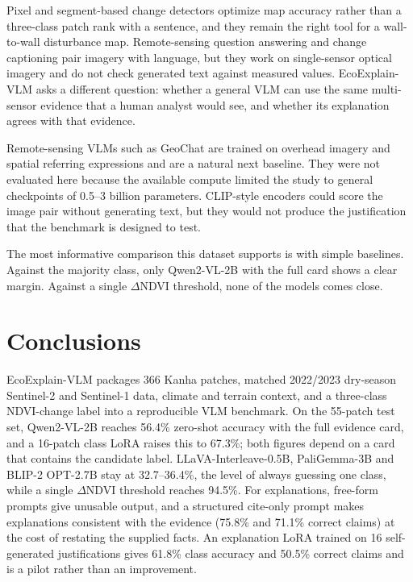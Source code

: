 Pixel and segment-based change detectors optimize map accuracy
rather than a three-class patch rank with a sentence, and they remain
the right tool for a wall-to-wall disturbance map. Remote-sensing
question answering  and change captioning
 pair imagery with language, but they work on
single-sensor optical imagery and do not check generated text against
measured values. EcoExplain-VLM asks a different question: whether a
general VLM can use the same multi-sensor evidence that a human analyst
would see, and whether its explanation agrees with that evidence.

Remote-sensing VLMs such as GeoChat are trained on
overhead imagery and spatial referring expressions and are a natural
next baseline. They were not evaluated here because the available
compute limited the study to general checkpoints of 0.5--3 billion
parameters. CLIP-style encoders could score the
image pair without generating text, but they would not produce the
justification that the benchmark is designed to test.

The most informative comparison this dataset supports is with simple
baselines. Against the majority class, only Qwen2-VL-2B with the full
card shows a clear margin. Against a single $\Delta$NDVI threshold, none
of the models comes close.


\section{Conclusions}

EcoExplain-VLM packages 366 Kanha patches, matched 2022/2023 dry-season
Sentinel-2 and Sentinel-1 data, climate and terrain context, and a
three-class NDVI-change label into a reproducible VLM benchmark. On the
55-patch test set, Qwen2-VL-2B reaches 56.4\% zero-shot accuracy with
the full evidence card, and a 16-patch class LoRA raises this to
67.3\%; both figures depend on a card that contains the candidate label.
LLaVA-Interleave-0.5B, PaliGemma-3B and BLIP-2 OPT-2.7B stay at
32.7--36.4\%, the level of always guessing one class, while a single
$\Delta$NDVI threshold reaches 94.5\%. For explanations, free-form
prompts give unusable output, and a structured cite-only prompt makes
explanations consistent with the evidence (75.8\% and 71.1\% correct
claims) at the cost of restating the supplied facts. An explanation LoRA
trained on 16 self-generated justifications gives 61.8\% class accuracy
and 50.5\% correct claims and is a pilot rather than an improvement.

